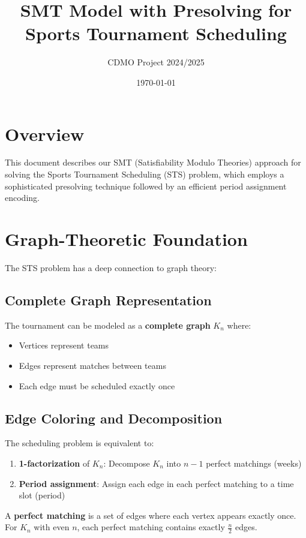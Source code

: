 \documentclass{article}
\title{SMT Model with Presolving for Sports Tournament Scheduling}
\author{CDMO Project 2024/2025}
\date{\today}
\begin{document}
\maketitle

\section{Overview}

This document describes our SMT (Satisfiability Modulo Theories) approach for solving the Sports Tournament Scheduling (STS) problem, which employs a sophisticated presolving technique followed by an efficient period assignment encoding.

\section{Graph-Theoretic Foundation}

The STS problem has a deep connection to graph theory:

\subsection{Complete Graph Representation}
The tournament can be modeled as a \textbf{complete graph} $K_n$ where:
\begin{itemize}
    \item Vertices represent teams
    \item Edges represent matches between teams
    \item Each edge must be scheduled exactly once
\end{itemize}

\subsection{Edge Coloring and Decomposition}
The scheduling problem is equivalent to:
\begin{enumerate}
    \item \textbf{1-factorization} of $K_n$: Decompose $K_n$ into $n-1$ perfect matchings (weeks)
    \item \textbf{Period assignment}: Assign each edge in each perfect matching to a time slot (period)
\end{enumerate}

A \textbf{perfect matching} is a set of edges where each vertex appears exactly once. For $K_n$ with even $n$, each perfect matching contains exactly $\frac{n}{2}$ edges.
\end{document}

